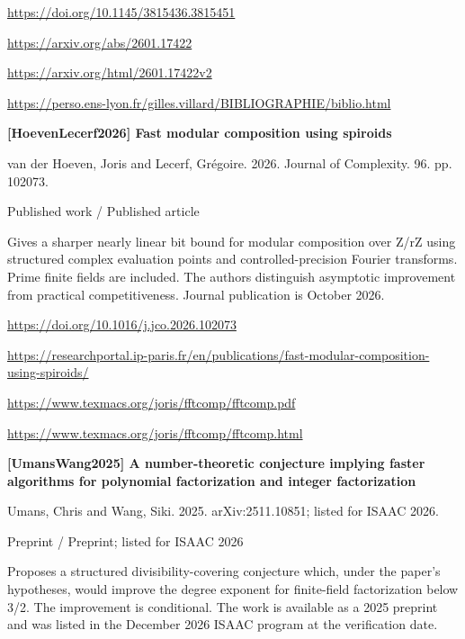 \documentclass[11pt,a4paper,oneside,openany]{book}
\begin{document}
{\footnotesize\url{https://doi.org/10.1145/3815436.3815451}}\par
{\footnotesize\url{https://arxiv.org/abs/2601.17422}}\par
{\footnotesize\url{https://arxiv.org/html/2601.17422v2}}\par
{\footnotesize\url{https://perso.ens-lyon.fr/gilles.villard/BIBLIOGRAPHIE/biblio.html}}\par
\vspace{9pt}
\hypertarget{ref:HoevenLecerf2026}{}
{\sffamily\bfseries\color{atlasgreen}[HoevenLecerf2026] Fast modular composition using spiroids}\par
\color{black} van der Hoeven, Joris and Lecerf, Grégoire. 2026. Journal of Complexity. 96. pp. 102073.\par
{\small\sffamily\color{atlasgold}Published work / Published article}\par
\color{black} Gives a sharper nearly linear bit bound for modular composition over Z/rZ using structured complex evaluation points and controlled-precision Fourier transforms. Prime finite fields are included. The authors distinguish asymptotic improvement from practical competitiveness. Journal publication is October 2026.\par
{\footnotesize\url{https://doi.org/10.1016/j.jco.2026.102073}}\par
{\footnotesize\url{https://researchportal.ip-paris.fr/en/publications/fast-modular-composition-using-spiroids/}}\par
{\footnotesize\url{https://www.texmacs.org/joris/fftcomp/fftcomp.pdf}}\par
{\footnotesize\url{https://www.texmacs.org/joris/fftcomp/fftcomp.html}}\par
\vspace{9pt}
\hypertarget{ref:UmansWang2025}{}
{\sffamily\bfseries\color{atlasgreen}[UmansWang2025] A number-theoretic conjecture implying faster algorithms for polynomial factorization and integer factorization}\par
\color{black} Umans, Chris and Wang, Siki. 2025. arXiv:2511.10851; listed for ISAAC 2026.\par
{\small\sffamily\color{atlasgold}Preprint / Preprint; listed for ISAAC 2026}\par
\color{black} Proposes a structured divisibility-covering conjecture which, under the paper's hypotheses, would improve the degree exponent for finite-field factorization below 3/2. The improvement is conditional. The work is available as a 2025 preprint and was listed in the December 2026 ISAAC program at the verification date.\par
\end{document}

